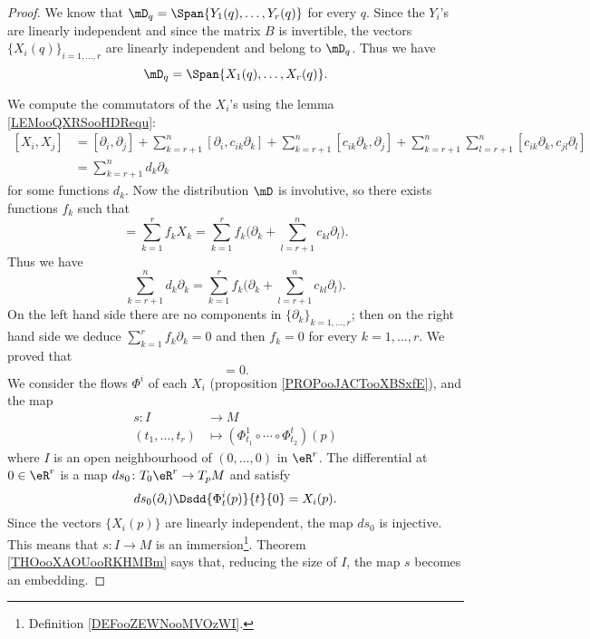 \begin{proof}
    We know that \( \mD_q=\Span\{ Y_1(q),\ldots, Y_r(q) \}\) for every \( q\). Since the \( Y_i\)'s are linearly independent and since the matrix \( B\) is invertible, the vectors \( \{ X_i(q) \}_{i=1,\ldots, r}\) are linearly independent and belong to \( \mD_q\). Thus we have
    \begin{equation}
        \mD_q=\Span\{ X_1(q),\ldots, X_r(q)  \}.
    \end{equation}
    
    We compute the commutators of the \( X_i\)'s using the lemma \ref{LEMooQXRSooHDRequ}:
    \begin{subequations}
        \begin{align}
            [X_i,X_j]&=[\partial_i,\partial_j]+\sum_{k=r+1}^n[\partial_i,c_{ik}\partial_k]+\sum_{k=r+1}^n[c_{ik}\partial_k,\partial_j]+\sum_{k=r+1}^n\sum_{l=r+1}^n[c_{ik}\partial_k,c_{jl}\partial_l]\\
            &=\sum_{k=r+1}^nd_k\partial_k
        \end{align}
    \end{subequations}
    for some functions \( d_k\). Now the distribution \( \mD\) is involutive, so there exists functions \( f_k\) such that
    \begin{equation}
        [X_i,X_j]=\sum_{k=1}^rf_kX_k=\sum_{k=1}^rf_k\big( \partial_k+\sum_{l=r+1}^nc_{kl}\partial_l \big).
    \end{equation}
    Thus we have
    \begin{equation}
        \sum_{k=r+1}^nd_k\partial_k=\sum_{k=1}^rf_k\big( \partial_k+\sum_{l=r+1}^nc_{kl}\partial_l \big).
    \end{equation}
    On the left hand side there are no components in \( \{ \partial_k \}_{k=1,\ldots, r}\); then on the right hand side we deduce \( \sum_{k=1}^rf_k\partial_k=0\) and then \( f_k=0\) for every \( k=1,\ldots, r\). We proved that 
    \begin{equation}
        [X_i,X_j]=0.
    \end{equation}
    We consider the flows \( \Phi^i\) of each \( X_i\) (proposition \ref{PROPooJACTooXBSxfE}), and the map
    \begin{equation}
        \begin{aligned}
            s\colon I&\to M \\
            (t_1,\ldots, t_r)&\mapsto (\Phi_{t_1}^1\circ \cdots\circ \Phi_{t_2}^t)(p) 
        \end{aligned}
    \end{equation}
    where \( I\) is an open neighbourhood of \( (0,\ldots, 0)\) in \( \eR^r\). The differential at \( 0\in \eR^r\) is a map \( ds_0\colon T_0\eR^r\to T_pM\) and satisfy
    \begin{equation}
        ds_0(\partial_i)\Dsdd{ \Phi_t^i(p) }{t}{0}=X_i(p).
    \end{equation}
    Since the vectors \( \{ X_i(p) \}\) are linearly independent, the map \( ds_0\) is injective. This means that \( s\colon I\to M\) is an immersion\footnote{Definition \ref{DEFooZEWNooMVOzWI}.}. Theorem \ref{THOooXAOUooRKHMBm} says that, reducing the size of \( I\), the map \( s\) becomes an embedding.


\end{proof}
